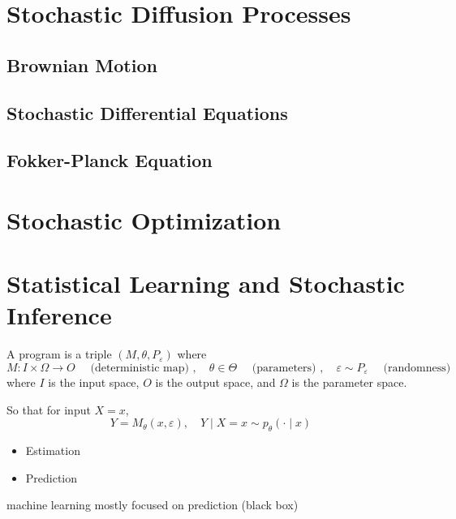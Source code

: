 \documentclass[11pt, headings=standardclasses, parskip=half, twoside]{scrartcl}
\begin{document}
\section{Stochastic Diffusion Processes}\label{sec:diffusion}


\subsection{Brownian Motion}\label{subsec:brownian}


\subsection{Stochastic Differential Equations}\label{subsec:sde}


\subsection{Fokker-Planck Equation}\label{subsec:fp}





\section{Stochastic Optimization}\label{sec:optimization}


\section{Statistical Learning and Stochastic Inference}
\label{sec:statistical_learning}

\begin{definition}[Program]\label{def:program}
A program is a triple $\left(M, \theta, P_{\varepsilon}\right)$ where
$$
M: I \times \Omega \rightarrow O \quad \text { (deterministic map) }, \quad \theta \in \Theta \quad \text { (parameters) }, \quad \varepsilon \sim P_{\varepsilon} \quad \text { (randomness) }
$$
where $I$ is the input space, $O$ is the output space, and $\Omega$ is the parameter space.

So that for input $X=x$,
$$
Y=M_\theta(x, \varepsilon), \quad Y \mid X=x \sim p_\theta(\cdot \mid x)
$$
\end{definition}


\begin{itemize}
\item Estimation
\item Prediction
\end{itemize}
machine learning mostly focused on prediction (black box)
\end{document}
